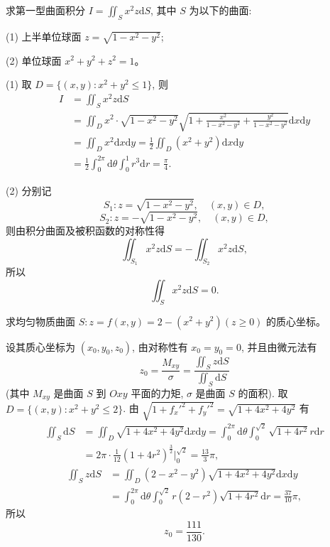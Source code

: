 \documentclass[UTF8,12pt,a4paper,fontset=fandol]{ctexart}
\begin{document}
\begin{example}\label{course-example-16-3-3}\quad 求第一型曲面积分 $I=\iint_S x^2z\mathrm dS$, 其中 $S$ 为以下的曲面:

(1) 上半单位球面 $z=\sqrt{1-x^2-y^2}$;

(2) 单位球面 $x^2+y^2+z^2=1$。

\end{example}
\begin{solve}\quad (1) 取 $D=\{(x,y):x^2+y^2\leqslant1\}$, 则
\[
\begin{aligned}
  I&=\iint_S x^2z\mathrm dS\\
  &=\iint_D x^2\cdot\sqrt{1-x^2-y^2}
    \sqrt{1+\frac{x^2}{1-x^2-y^2}+\frac{y^2}{1-x^2-y^2}}\mathrm dx\mathrm dy\\
  &=\iint_D x^2\mathrm dx\mathrm dy
    =\frac12\iint_D(x^2+y^2)\mathrm dx\mathrm dy\\
  &=\frac12\int_0^{2\pi}\mathrm d\theta\int_0^1r^3\mathrm dr=\frac\pi4.
\end{aligned}
\]

(2) 分别记
\[
  S_1:z=\sqrt{1-x^2-y^2},\quad (x,y)\in D,
\]
\[
  S_2:z=-\sqrt{1-x^2-y^2},\quad (x,y)\in D,
\]
则由积分曲面及被积函数的对称性得
\[
  \iint_{S_1}x^2z\mathrm dS=-\iint_{S_2}x^2z\mathrm dS,
\]
所以
\[
  \iint_S x^2z\mathrm dS=0.
\]

\end{solve}
\begin{example}\label{course-example-16-3-4}\quad 求均匀物质曲面 $S:z=f(x,y)=2-(x^2+y^2)(z\geqslant0)$ 的质心坐标。

\end{example}
\begin{solve}\quad 设其质心坐标为 $(x_0,y_0,z_0)$, 由对称性有 $x_0=y_0=0$, 并且由微元法有
\[
  z_0=\frac{M_{xy}}{\sigma}=\frac{\iint_S z\mathrm dS}{\iint_S\mathrm dS}
\]
(其中 $M_{xy}$ 是曲面 $S$ 到 $Oxy$ 平面的力矩, $\sigma$ 是曲面 $S$ 的面积). 取 $D=\{(x,y):x^2+y^2\leqslant2\}$. 由 $\sqrt{1+f_x'^2+f_y'^2}=\sqrt{1+4x^2+4y^2}$ 有
\[
\begin{aligned}
  \iint_S\mathrm dS
  &=\iint_D\sqrt{1+4x^2+4y^2}\mathrm dx\mathrm dy
    =\int_0^{2\pi}\mathrm d\theta\int_0^{\sqrt2}\sqrt{1+4r^2}r\mathrm dr\\
  &=2\pi\cdot\frac1{12}(1+4r^2)^{\frac32}\bigg|_0^{\sqrt2}
    =\frac{13}3\pi,
\end{aligned}
\]
\[
\begin{aligned}
  \iint_S z\mathrm dS
  &=\iint_D(2-x^2-y^2)\sqrt{1+4x^2+4y^2}\mathrm dx\mathrm dy\\
  &=\int_0^{2\pi}\mathrm d\theta\int_0^{\sqrt2}r(2-r^2)\sqrt{1+4r^2}\mathrm dr
    =\frac{37}{10}\pi,
\end{aligned}
\]
所以
\[
  z_0=\frac{111}{130}.
\]

\end{solve}
\end{document}
